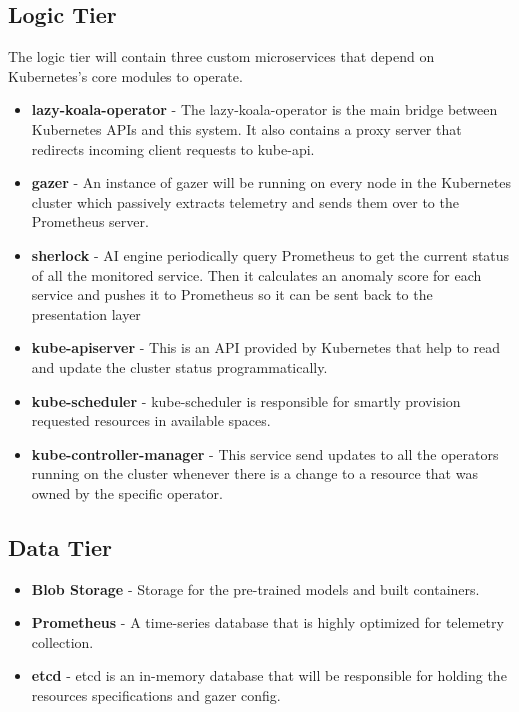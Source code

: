 \subsection{Logic Tier}

The logic tier will contain three custom microservices that depend on Kubernetes's core modules to operate.

\begin{itemize}[noitemsep,nolistsep] 
    \item \textbf{\ac{lazy-koala-operator}} - The \ac{lazy-koala-operator} is the main bridge between Kubernetes APIs and this system. It also contains a proxy server that redirects incoming client requests to kube-api.
    \item \textbf{\ac{gazer}} - An instance of \ac{gazer} will be running on every node in the Kubernetes cluster which passively extracts telemetry and sends them over to the Prometheus server.
    \item \textbf{\ac{sherlock}} - AI engine periodically query Prometheus to get the current status of all the monitored service. Then it calculates an anomaly score for each service and pushes it to Prometheus so it can be sent back to the presentation layer
    \item \textbf{kube-apiserver} - This is an API provided by Kubernetes that help to read and update the cluster status programmatically.
    \item \textbf{kube-scheduler} - kube-scheduler is responsible for smartly provision requested resources in available spaces.
    \item \textbf{kube-controller-manager} - This service send updates to all the operators running on the cluster whenever there is a change to a resource that was owned by the specific operator.
\end{itemize}

\subsection{Data Tier}

\begin{itemize}[noitemsep,nolistsep] 
    \item \textbf{Blob Storage} - Storage for the pre-trained models and built containers.
    \item \textbf{Prometheus} - A time-series database that is highly optimized for telemetry collection.
    \item \textbf{etcd} - etcd is an in-memory database that will be responsible for holding the resources specifications and \ac{gazer} config.
\end{itemize}